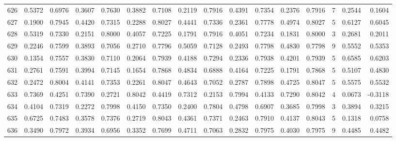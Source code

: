 \begin{tabular}{lrrrrrrrrrrrrrrr}
626 &      0.5372 &  0.6976 &  0.3607 &  0.7630 &  0.3882 &  0.7108 &  0.2119 &  0.7916 &  0.4391 &  0.7354 &   0.2376 &     0.7916 &      7 &                    0.2544 &                     0.1604 \\
627 &      0.1900 &  0.7945 &  0.4420 &  0.7315 &  0.2288 &  0.8027 &  0.4441 &  0.7336 &  0.2361 &  0.7778 &   0.4974 &     0.8027 &      5 &                    0.6127 &                     0.6045 \\
628 &      0.5319 &  0.7330 &  0.2151 &  0.8000 &  0.4057 &  0.7225 &  0.1791 &  0.7916 &  0.4051 &  0.7234 &   0.1831 &     0.8000 &      3 &                    0.2681 &                     0.2011 \\
629 &      0.2246 &  0.7599 &  0.3893 &  0.7056 &  0.2710 &  0.7796 &  0.5059 &  0.7128 &  0.2493 &  0.7798 &   0.4830 &     0.7798 &      9 &                    0.5552 &                     0.5353 \\
630 &      0.1354 &  0.7557 &  0.3830 &  0.7110 &  0.2064 &  0.7939 &  0.4188 &  0.7294 &  0.2336 &  0.7938 &   0.4201 &     0.7939 &      5 &                    0.6585 &                     0.6203 \\
631 &      0.2761 &  0.7591 &  0.3994 &  0.7145 &  0.1654 &  0.7868 &  0.4834 &  0.6888 &  0.4164 &  0.7225 &   0.1791 &     0.7868 &      5 &                    0.5107 &                     0.4830 \\
632 &      0.2472 &  0.8004 &  0.4141 &  0.7353 &  0.2261 &  0.8047 &  0.4643 &  0.7052 &  0.2787 &  0.7898 &   0.4725 &     0.8047 &      5 &                    0.5575 &                     0.5532 \\
633 &      0.7369 &  0.4251 &  0.7390 &  0.2721 &  0.8042 &  0.4419 &  0.7312 &  0.2153 &  0.7994 &  0.4133 &   0.7290 &     0.8042 &      4 &                    0.0673 &                    -0.3118 \\
634 &      0.4104 &  0.7319 &  0.2272 &  0.7998 &  0.4150 &  0.7350 &  0.2400 &  0.7804 &  0.4798 &  0.6907 &   0.3685 &     0.7998 &      3 &                    0.3894 &                     0.3215 \\
635 &      0.6725 &  0.7483 &  0.3578 &  0.7376 &  0.2719 &  0.8043 &  0.4361 &  0.7371 &  0.2463 &  0.7910 &   0.4137 &     0.8043 &      5 &                    0.1318 &                     0.0758 \\
636 &      0.3490 &  0.7972 &  0.3934 &  0.6956 &  0.3352 &  0.7699 &  0.4711 &  0.7063 &  0.2832 &  0.7975 &   0.4030 &     0.7975 &      9 &                    0.4485 &                     0.4482 \\

\end{tabular}
